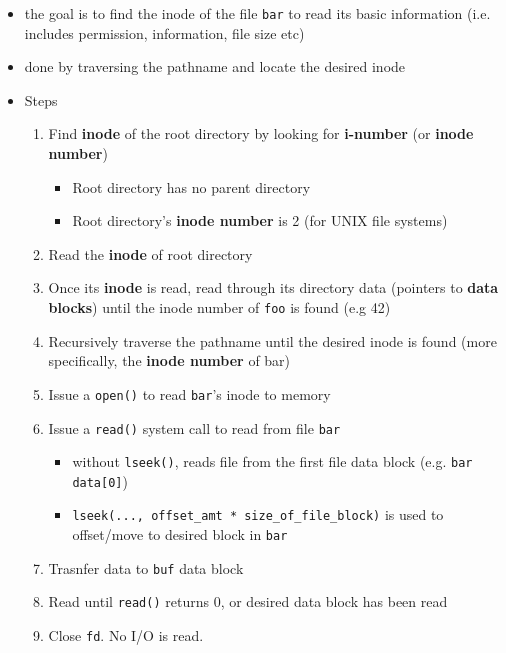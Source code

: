 \documentclass[12pt]{article}
\begin{document}
\begin{itemize}
    \item the goal is to find the inode of the file \texttt{bar} to read its basic information
    (i.e. includes permission, information, file size etc)
    \item done by traversing the pathname and locate the desired inode
    \item Steps

    \begin{enumerate}[1.]
        \item Find \textbf{inode} of the root directory by looking for \textbf{i-number} (or
        \textbf{inode number})
        \begin{itemize}
            \item Root directory has no parent directory
            \item Root directory's \textbf{inode number} is 2 (for UNIX file systems)
        \end{itemize}

        \item Read the \textbf{inode} of root directory
        \item Once its \textbf{inode} is read, read through its directory data (pointers to \textbf{data blocks})
        until the inode number of \texttt{foo} is found (e.g 42)
        \item Recursively traverse the pathname until the desired inode is found (more specifically, the \textbf{inode number} of bar)
        \item Issue a \texttt{open()} to read \texttt{bar}'s inode to memory
        \item Issue a \texttt{read()} system call to read from file \texttt{bar}

        \begin{itemize}
            \item without \texttt{lseek()}, reads file from the first file data block (e.g. \texttt{bar data[0]})
            \item \texttt{lseek(..., offset\_amt * size\_of\_file\_block)} is used to offset/move to desired block in \texttt{bar}
        \end{itemize}

        \item Trasnfer data to \texttt{buf} data block

        \item Read until \texttt{read()} returns 0, or desired data block has been read
        \item Close \texttt{fd}. No I/O is read.
    \end{enumerate}
\end{itemize}
\end{document}
